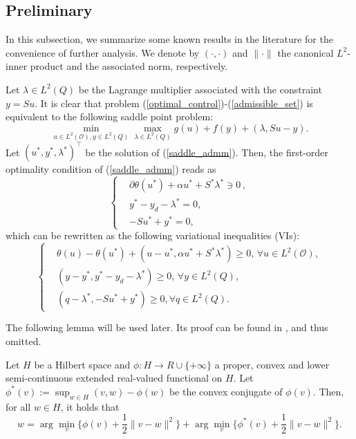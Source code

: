 \documentclass[final]{siamart171218}
\theoremstyle{remark}
\begin{document}
\subsection{Preliminary}
In this subsection, we summarize some known results in the literature for the convenience of
further analysis. We denote by $(\cdot,\cdot)$ and $\|\cdot\|$ the canonical $L^2$-inner product and the associated norm, respectively.

Let $\lambda\in L^2(Q)$ be the Lagrange multiplier associated with the constraint $y=Su$. It is clear that  problem (\ref{optimal_control})-(\ref{admissible_set}) is equivalent to the following saddle point problem:
\begin{equation}\label{saddle_admm}
\min_{u\in L^2(\mathcal{O}), y \in L^2(Q)} \max_{\lambda \in L^2(Q)} g(u) + f(y) + (\lambda, Su - y).
\end{equation}
Let $(u^*, y^*, \lambda^*)^\top$ be the solution of (\ref{saddle_admm}). Then, the first-order optimality condition of (\ref{saddle_admm}) reads as
\begin{equation}
\left\{\begin{aligned}
\label{opt}
&  \partial \theta(u^*)+\alpha u^* + S^*\lambda^*\ni 0  \, , \\
& y^*-y_d-\lambda^*=0,\\
& -Su^*+ y^*=0,
\end{aligned}\right.
\end{equation}
which can be rewritten as the following variational inequalities (VIs):
\begin{equation}\left\{\begin{aligned}
\label{VIopt}
& \theta(u)-\theta(u^*)+\left(u - u^*,  \alpha u^* + S^*\lambda^*  \right) \geq 0, \, \forall u\in L^2(\mathcal{O}), \\
& \left(y - y^*,  y^*-y_d- \lambda^* \right) \geq 0, \, \forall y \in L^2(Q),\\
& \left(q - \lambda^*, -Su^* + y^* \right) \geq 0, \forall q \in L^2(Q).
\end{aligned}\right.\end{equation}

The following lemma will be used later. Its proof can be found in \cite{bauschke2011}, and thus omitted.


\begin{lemma}
	Let $H$ be a Hilbert space and $\phi: H \rightarrow R \cup \{+\infty\}$ a proper, convex and lower semi-continuous extended real-valued functional on $H$. Let $\phi^*(v):={\sup}_{w\in H}(v,w)-\phi(w)$ be the convex conjugate of $\phi(v)$. Then, for all $w \in H$, it holds that
	\begin{equation}
	\label{moreau1}
	w = \arg\min_v\{\phi(v)+ \frac{1}{2}\| v - w \|^2\} + \arg\min_v\{\phi^*(v)+ \frac{1}{2}\| v - w \|^2\}.
	\end{equation}
	
\end{lemma}
\end{document}

